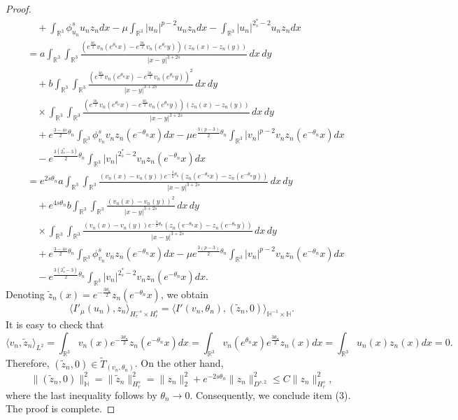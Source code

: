 \documentclass[reqno]{amsart}
\begin{document}
\begin{proof}
\begin{align*}
&\quad +\int_{\mathbb{R}^3}\phi^s_{u_n}{u_n}z_ndx
 -\mu\int_{\mathbb{R}^3}|u_n|^{p-2}u_n z_ndx-\int_{\mathbb{R}^3}|u_n|^{2^*_s-2}u_n z_ndx\\
&=  a\int_{\mathbb{R}^3}\int_{\mathbb{R}^3}\frac{(e^{\frac{3\theta_n}{2}}
 v_n(e^{\theta_n} x)-e^{\frac{3\theta_n}{2}}v_n(e^{\theta_n} y))(z_n(x)
 -z_n(y))}{|x-y|^{3+2s}}\,dx\,dy\\
&\quad +b\int_{\mathbb{R}^3}\int_{\mathbb{R}^3}
 \frac{(e^{\frac{3\theta_n}{2}}v_n(e^{\theta_n} x)-e^{\frac{3\theta_n}{2}}
 v_n(e^{\theta_n} y))^2}{|x-y|^{3+2s}}\,dx\,dy \\
 &\quad\times \int_{\mathbb{R}^3}
 \int_{\mathbb{R}^3}\frac{(e^{\frac{3\theta_n}{2}}v_n(e^{\theta_n } x)
 -e^{\frac{3\theta_n}{2}}v_n(e^{\theta_n} y))(z_n(x)-z_n(y))}{|x-y|^{3+2s}}\,dx\,dy\\
&\quad +e^{\frac{3-4s}{2}\theta_n}\int_{\mathbb{R}^3}\phi^s_{v_n}{v_n}
 z_n(e^{-\theta_n}x)dx-\mu e^{\frac{3(p-3)}{2}\theta_n}\int_{\mathbb{R}^3}
 |v_n|^{p-2}v_n z_n(e^{-\theta_n}x) dx\\
&\quad -e^{\frac{3(2^*_s-3)}{2}\theta_n}\int_{\mathbb{R}^3}|v_n|^{2^*_s-2}
 v_n z_n(e^{-\theta_n}x) dx\\
&= e^{2s\theta_n}a\int_{\mathbb{R}^3}\int_{\mathbb{R}^3}\frac{(v_n(x)-v_n(y))
 e^{-\frac{3}{2}\theta_n}(z_n(e^{-\theta_n} x)-z_n(e^{-\theta_n}y))}
  {|x-y|^{3+2s}}\,dx\,dy\\
&\quad +e^{4s\theta_n}b\int_{\mathbb{R}^3}\int_{\mathbb{R}^3}
 \frac{(v_n( x)-v_n( y))^2}{|x-y|^{3+2s}}\,dx\,dy \\
 &\quad\times  \int_{\mathbb{R}^3}\int_{\mathbb{R}^3}\frac{(v_n( x)-v_n( y))
 e^{-\frac{3}{2}\theta_n}(z_n(e^{-\theta_n} x)
 -z_n(e^{-\theta_n}y))}{|x-y|^{3+2s}}\,dx\,dy  \\
&\quad +e^{\frac{3-4s}{2}\theta_n}\int_{\mathbb{R}^3}\phi^s_{v_n}{v_n}z_n
 (e^{-\theta_n}x)dx-\mu e^{\frac{3(p-3)}{2}\theta_n}
 \int_{\mathbb{R}^3}|v_n|^{p-2}v_n z_n(e^{-\theta_n}x) dx\\
&\quad -e^{\frac{3(2^*_s-3)}{2}\theta_n}\int_{\mathbb{R}^3}|v_n|^{2^*_s-2}
v_n z_n(e^{-\theta_n}x) dx.
\end{align*}
Denoting $\tilde{z}_n(x)=e^{-\frac{3\theta_n}{2}}z_n(e^{-\theta_n}x)$,
 we obtain
$$
\langle I'_\mu(u_n),z_n\rangle_{{H^{-s}_r}\times H^s_r}
=\langle I'(v_n, \theta_n), (\tilde{z}_n, 0) \rangle_{\mathbb{H}^{-1}\times \mathbb{H}}.
$$
It is easy to check that
\[  %
 \langle v_n, \tilde{z}_n\rangle_{L^2}=\int_{\mathbb{R}^3} v_n(x) e^{-\frac{3\theta_n}{2}}z_n(e^{-\theta_n}x)dx
 =\int_{\mathbb{R}^3} v_n(e^{\theta_n}x) e^{\frac{3\theta_n}{2}}z_n(x)dx
 =\int_{\mathbb{R}^3}u_n(x)z_n(x)dx=0.
\]
Therefore, $(\tilde{z}_n, 0)\in \tilde{T}_{(v_n, \theta_n)}$.
On the other hand,
$$
\|(\tilde{z}_n,0)\|^2_{\mathbb{H}}=\|\tilde{z}_n\|^2_{{H^s_r}}=\|z_n\|^2_2
+e^{-2s\theta_n}\|z_n\|^2_{D^{s,2}}\leq C\|z_n\|^2_{H^s_r},
$$
where the last inequality follows by $\theta_n\to 0$. Consequently, we conclude
item (3). The proof is complete.
\end{proof}
\end{document}
